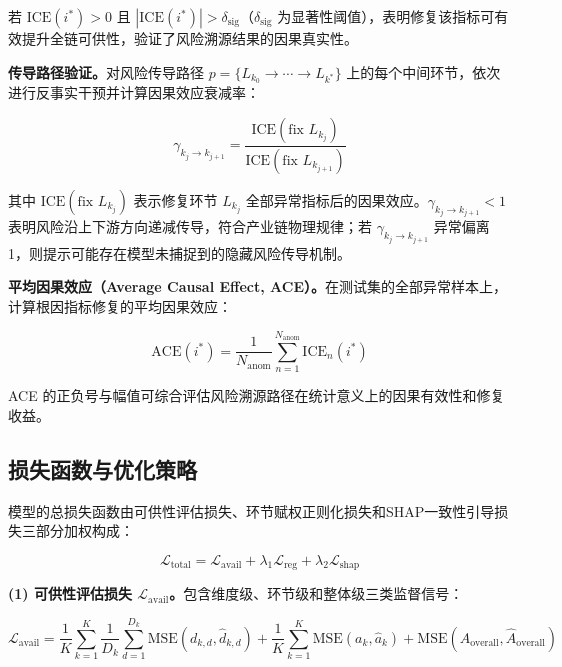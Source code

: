 若 $\text{ICE}(i^*) > 0$ 且 $|\text{ICE}(i^*)| > \delta_{\text{sig}}$（$\delta_{\text{sig}}$ 为显著性阈值），表明修复该指标可有效提升全链可供性，验证了风险溯源结果的因果真实性。

\textbf{传导路径验证。}对风险传导路径 $p=\{L_{k_0}\to\cdots\to L_{k^*}\}$ 上的每个中间环节，依次进行反事实干预并计算因果效应衰减率：

\begin{equation}
\gamma_{k_j\to k_{j+1}} = \frac{\text{ICE}(\text{fix }L_{k_j})}{\text{ICE}(\text{fix }L_{k_{j+1}})}
\end{equation}

其中 $\text{ICE}(\text{fix }L_{k_j})$ 表示修复环节 $L_{k_j}$ 全部异常指标后的因果效应。$\gamma_{k_j\to k_{j+1}} < 1$ 表明风险沿上下游方向递减传导，符合产业链物理规律；若 $\gamma_{k_j\to k_{j+1}}$ 异常偏离 1，则提示可能存在模型未捕捉到的隐藏风险传导机制。

\textbf{平均因果效应（Average Causal Effect, ACE）。}在测试集的全部异常样本上，计算根因指标修复的平均因果效应：

\begin{equation}
\text{ACE}(i^*) = \frac{1}{N_{\text{anom}}} \sum_{n=1}^{N_{\text{anom}}} \text{ICE}_n(i^*)
\end{equation}

ACE 的正负号与幅值可综合评估风险溯源路径在统计意义上的因果有效性和修复收益。

\subsection{损失函数与优化策略}

模型的总损失函数由可供性评估损失、环节赋权正则化损失和SHAP一致性引导损失三部分加权构成：

\begin{equation}
\mathcal{L}_{\text{total}} = \mathcal{L}_{\text{avail}} + \lambda_1\mathcal{L}_{\text{reg}} + \lambda_2\mathcal{L}_{\text{shap}}
\end{equation}

\textbf{(1) 可供性评估损失 $\mathcal{L}_{\text{avail}}$。}包含维度级、环节级和整体级三类监督信号：

\begin{equation}
\mathcal{L}_{\text{avail}} = \frac{1}{K}\sum_{k=1}^{K}\frac{1}{D_k}\sum_{d=1}^{D_k}\text{MSE}(d_{k,d},\hat{d}_{k,d}) + \frac{1}{K}\sum_{k=1}^{K}\text{MSE}(a_k,\hat{a}_k) + \text{MSE}(A_{\text{overall}},\hat{A}_{\text{overall}})
\end{equation}

